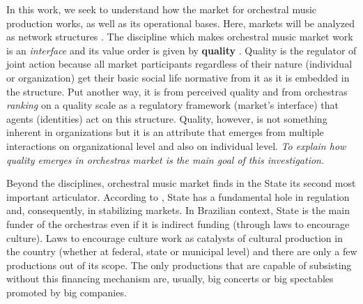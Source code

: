 \documentclass[a4paper, 12pt, openright, oneside, german, french, brazil, english, article]{abntex2}
\begin{document}
	In this work, we seek to understand how the market for orchestral music production works, as well as its operational bases. Here, markets will be analyzed as network structures \cite{white2002markets}. The discipline which makes orchestral music market work is an \textit{interface} and its value order is given by \textbf{quality} \cite{white2002markets}. Quality is the regulator of joint action because all market participants regardless of their nature (individual or organization) get their basic social life normative from it as it is embedded in the structure. Put another way, it is from perceived quality and from orchestras \textit{ranking} on a quality scale as a regulatory framework (market's interface) that agents (identities) act on this structure. Quality, however, is not something inherent in organizations but it is an attribute that emerges from multiple interactions on organizational level and also on individual level. \textit{To explain how quality emerges in orchestras market is the main goal of this investigation.}
	
	
	Beyond the disciplines, orchestral music market finds in the State its second most important articulator. According to , State has a fundamental hole in regulation and, consequently, in stabilizing markets. In Brazilian context, State is the main funder of the orchestras even if it is indirect funding (through laws to encourage culture). Laws to encourage culture work as catalysts of cultural production in the country (whether at federal, state or municipal level) and there are only a few productions out of its scope. The only productions that are capable of subsisting without this financing mechanism are, usually, big concerts or big spectables promoted by big companies.
	
\end{document}
